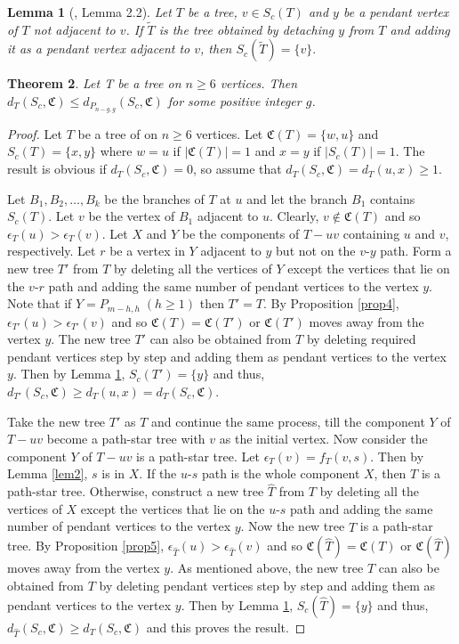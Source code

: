 \documentclass[10pt,a4paper]{amsart}
\newtheorem{theorem}{Theorem}[section]
\newtheorem{lemma}[theorem]{Lemma}
\begin{document}
\begin{lemma}[\cite{Des}, Lemma 2.2]\label{lem:sc1}
Let $T$ be a tree, $v\in S_c(T)$ and $y$ be a pendant vertex of $T$ not adjacent to $v$. If $\tilde{T}$ is the tree obtained by detaching $y$ from $T$ and adding it as a pendant vertex adjacent to $v$, then $S_c(\tilde{T}) = \{v\}.$
\end{lemma}
\begin{theorem}\label{thm:sc1}
Let T be a tree on $n\geq 6$ vertices. Then  $d_T(S_c,\mathfrak{C})\leq d_{P_{n-g,g}}(S_c,\mathfrak{C})$ for some positive integer $g$.
\end{theorem}
\begin{proof}
Let $T$ be a tree of on $n\geq 6$ vertices. Let $\mathfrak{C}(T)=\{w,u\}$ and $S_c(T)=\{x,y\}$ where $w=u$ if $|\mathfrak{C}(T)|=1$ and $x=y$ if $|S_c(T)|=1$.  The result is obvious if $d_T(S_c,\mathfrak{C})=0$, so assume that  $d_T(S_c,\mathfrak{C})=d_T(u,x)\geq 1$.

Let $B_1,B_2,\ldots,B_k$ be the branches of $T$ at $u$ and let the branch $B_1$ contains $S_c(T).$ Let $v$ be the vertex of $B_1$ adjacent to $u$. Clearly, $v\notin \mathfrak{C}(T)$ and so $\epsilon_T(u)>\epsilon_T(v)$. Let $X$ and $Y$ be the components of $T-uv$ containing $u$ and $v$, respectively. Let $r$ be a vertex in $Y$ adjacent to $y$ but not on the $v$-$y$ path. Form  a new tree $T'$ from $T$ by deleting all the vertices of $Y$ except the vertices that lie on the $v$-$r$ path and adding the same number of pendant vertices to the vertex $y$. Note that if $Y=P_{m-h,h}\;(h\geq 1)$ then $T'=T.$ By Proposition \ref{prop4}, $\epsilon_{T'}(u)>\epsilon_{T'}(v)$ and so $\mathfrak{C}(T)=\mathfrak{C}(T')$ or $\mathfrak{C}(T')$ moves away from the vertex $y$. The new tree $T'$ can also be obtained from $T$ by deleting required pendant vertices step by step and adding them as pendant vertices to the vertex $y$. Then by Lemma \ref{lem:sc1}, $S_c(T')=\{y\}$ and thus,  $d_{T'}(S_c,\mathfrak{C})\geq d_T(u,x)=d_T(S_c,\mathfrak{C})$.

Take the new tree $T'$ as $T$ and continue the same process, till the component $Y$ of $T-uv$ become a path-star tree with $v$ as the initial vertex. Now consider the component $Y$ of $T-uv$ is a path-star tree. Let  $\epsilon_{T}(v)=f_T(v,s)$. Then by Lemma \ref{lem2}, $s$ is in $X$. If  the $u$-$s$ path is the whole component $X$, then $T$ is a path-star tree. Otherwise, construct a new tree 
$\hat{T}$ from $T$ by deleting all the vertices of $X$ except the vertices that lie on the $u$-$s$ path and adding the same number of pendant vertices to the vertex $y$. Now the new tree $\hat{T}$ is a path-star tree. By Proposition \ref{prop5}, $\epsilon_{\hat{T}}(u)>\epsilon_{\hat{T}}(v)$ and so $\mathfrak{C}(\hat{T})=\mathfrak{C}(T)$ or $\mathfrak{C}(\hat{T})$ moves away from the vertex $y$. As mentioned above, the new tree $\hat{T}$ can also be obtained from $T$ by deleting pendant vertices step by step and adding them as pendant vertices to the vertex $y$. Then by Lemma \ref{lem:sc1}, $S_c(\hat{T})=\{y\}$ and thus, $d_{\hat{T}}(S_c,\mathfrak{C})\geq d_T(S_c,\mathfrak{C})$ and this proves the result.
\end{proof}
\end{document}
